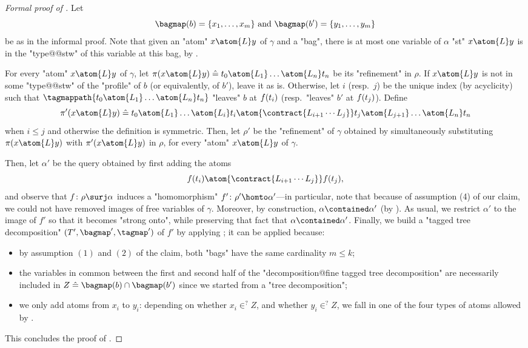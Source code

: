 \begin{proof}[Formal proof of ]
    Let
    \[\bagmap(b) = \{x_1,\hdots, x_m\}
    \text{ and }
    \bagmap(b') =\{y_1,\hdots,y_m\}
    \]
    be as in the informal proof.
    Note that given an "atom" $x \atom{L} y$ of $\gamma$ and
	a "bag", there is at most
    one variable of $\alpha$ "st" $x \atom{L} y$ is in the "type@@stw" of this variable
	at this bag, by .

    For every "atom" $x \atom{L} y$ of $\gamma$, let 
    $\pi(x \atom{L} y) \defeq t_0 \atom{L_1} \hdots \atom{L_n} t_n$
    be its "refinement" in $\rho$.
    If $x \atom{L} y$ is not in some "type@@stw" of the "profile" of $b$
    (or equivalently, of $b'$), leave it as is.
    Otherwise, let $i$ (resp.\ $j$) be the unique
    index (by acyclicity) such that
    $\tagmappath{t_0 \atom{L_1} \hdots \atom{L_n} t_n}$ "leaves" $b$
    at $f(t_i)$ (resp.\ "leaves" $b'$ at $f(t_j)$).
    Define
    \[
		\pi'(x \atom{L} y) \defeq
        t_0 \atom{L_1} \hdots \atom{L_i} t_i \atom{\contract{L_{i+1}\cdots L_j}}
        t_j \atom{L_{j+1}} \hdots \atom{L_n} t_n
    \]
    when $i \leq j$ and otherwise the definition is symmetric.
    Then, let $\rho'$ be the "refinement" of $\gamma$ obtained by simultaneously
    substituting $\pi(x \atom{L} y)$ with $\pi'(x\atom{L} y)$  in $\rho$,
    for every "atom" $x\atom{L} y$ of $\gamma$.

    Then, let $\alpha'$ be the query obtained by first
    adding the atoms  
    \[\fun(t_i) \atom{\contract{L_{i+1}\cdots L_j}} \fun(t_j),\]
    and observe that $\fun\colon \rho \surj \alpha$
    induces a "homomorphism" $\fun'\colon \rho' \homto \alpha'$---in particular, note that
	because of assumption (4) of our claim, we could not have removed images of
	free variables of $\gamma$.
    Moreover, by construction, $\alpha \contained \alpha'$ (by ).
	As usual, we restrict $\alpha'$ to the image of $f'$ so that it
	becomes "strong onto", while preserving that fact that $\alpha \contained \alpha'$.
	Finally, we build a "tagged tree decomposition" $(T', \bagmap', \tagmap')$
    of $f'$ by applying ; it can be applied because:
	\begin{itemize}
		\item by assumption $(1)$ and $(2)$ of the claim, both "bags" have the same cardinality $m \leq k$;
		\item the variables in common between the first and second half of the "decomposition@fine tagged tree decomposition" are necessarily included in $Z \defeq \bagmap(b) \cap \bagmap(b')$
		since we started from a "tree decomposition";
		\item we only add atoms from $x_i$ to $y_i$: depending on whether $x_i \in^? Z$,
		and whether $y_i \in^? Z$, we fall in one of the four types of atoms allowed
		by .
	\end{itemize}
	This concludes the proof of .
\end{proof}


